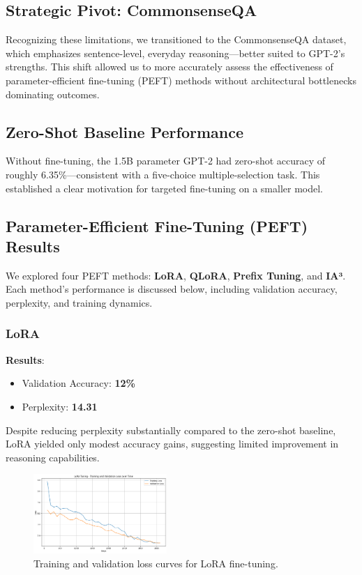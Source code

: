 \documentclass[11pt,twocolumn]{article}
\begin{document}
\subsection{Strategic Pivot: CommonsenseQA}
Recognizing these limitations, we transitioned to the CommonsenseQA dataset, which emphasizes sentence-level, everyday reasoning—better suited to GPT-2's strengths. This shift allowed us to more accurately assess the effectiveness of parameter-efficient fine-tuning (PEFT) methods without architectural bottlenecks dominating outcomes.

\subsection{Zero-Shot Baseline Performance}
Without fine-tuning, the 1.5B parameter GPT-2 had zero-shot accuracy of roughly 6.35\%—consistent with a five-choice multiple-selection task. This established a clear motivation for targeted fine-tuning on a smaller model.

\subsection{Parameter-Efficient Fine-Tuning (PEFT) Results}
We explored four PEFT methods: \textbf{LoRA}, \textbf{QLoRA}, \textbf{Prefix Tuning}, and \textbf{IA³}. Each method's performance is discussed below, including validation accuracy, perplexity, and training dynamics.

\subsubsection{LoRA}
\textbf{Results}:
\begin{itemize}
    \item Validation Accuracy: \textbf{12\%}
    \item Perplexity: \textbf{14.31}
\end{itemize}

Despite reducing perplexity substantially compared to the zero-shot baseline, LoRA yielded only modest accuracy gains, suggesting limited improvement in reasoning capabilities.
\begin{figure}[h]
\centering
\includegraphics[width=0.45\textwidth]{../graphs/LoRA.png}
\caption{Training and validation loss curves for LoRA fine-tuning.}
\label{fig:lora-loss}
\end{figure}
\end{document}
